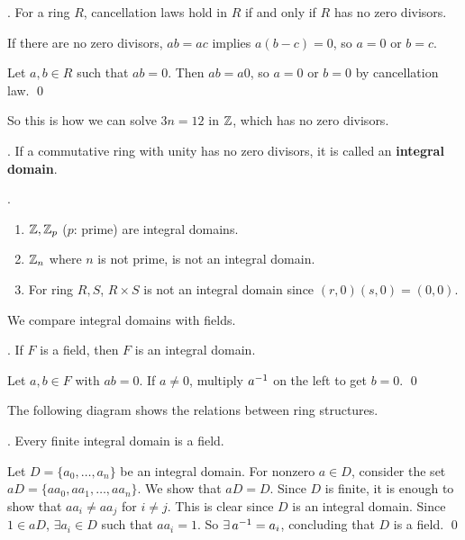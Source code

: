 \thm. For a ring \(R\), cancellation laws hold in \(R\) if and only if \(R\) has no zero divisors.

\pf \note{\mimpd} If there are no zero divisors, \(ab = ac\) implies \(a(b - c) = 0\), so \(a = 0\) or \(b = c\).

\note{\mimp} Let \(a, b \in R\) such that \(ab = 0\). Then \(ab = a0\), so \(a = 0\) or \(b = 0\) by cancellation law. \qed

So this is how we can solve \(3n = 12\) in \(\mathbb{Z}\), which has no zero divisors.

.  If a commutative ring with unity has no zero divisors, it is called an \textbf{integral domain}.

\ex.
\begin{enumerate}
    \item \(\mathbb{Z}, \mathbb{Z}_p\) (\(p\): prime) are integral domains.
    \item \(\mathbb{Z}_n\) where \(n\) is not prime, is not an integral domain.
    \item For ring \(R, S\), \(R \times S\) is not an integral domain since \((r, 0)(s, 0) = (0, 0)\).
\end{enumerate}

We compare integral domains with fields.

\thm. If \(F\) is a field, then \(F\) is an integral domain.

\pf Let \(a, b \in F\) with \(ab = 0\). If \(a \neq 0\), multiply \(a^{-1}\) on the left to get \(b = 0\). \qed

The following diagram shows the relations between ring structures.

\begin{center}
\end{center}

\thm. Every finite integral domain is a field.

\pf Let \(D = \{a_0, \dots, a_n\}\) be an integral domain. For nonzero \(a \in D\), consider the set \(aD = \{aa_0, aa_1, \dots, aa_n\}\). We show that \(aD = D\). Since \(D\) is finite, it is enough to show that \(aa_i \neq aa_j\) for \(i \neq j\). This is clear since \(D\) is an integral domain. Since \(1 \in aD\), \(\exists a_i \in D\) such that \(a a_i = 1\). So \(\exists a\inv = a_i\), concluding that \(D\) is a field. \qed

